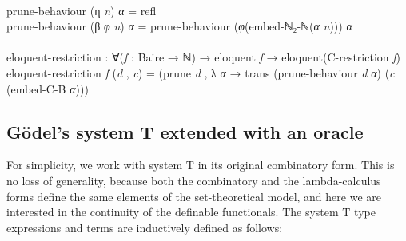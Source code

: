 \documentclass{entcs} \usepackage{prentcsmacro}
\newcommand{\AgdaC}[1]{\mbox{#1}}
\newcommand{\AgdaFontStyle}[1]{\textsf{#1}}
\newcommand{\AgdaBoundFontStyle}[1]{\textit{#1}}
\newcommand{\AgdaSymbol}      [1]{\textcolor{AgdaSymbol}{#1}}
\newcommand{\AgdaBound}    [1]{\AgdaBoundFontStyle{\textcolor{AgdaBound}{#1}}}
\newcommand{\AgdaInductiveConstructor}[1]
    {\AgdaFontStyle{\textcolor{AgdaInductiveConstructor}{#1}}}
\newcommand{\AgdaDatatype} [1]{\AgdaFontStyle{\textcolor{AgdaDatatype}{#1}}}
\newcommand{\AgdaFunction} [1]{\AgdaFontStyle{\textcolor{AgdaFunction}{#1}}}
\newcommand{\AgdaCodeStyle}{\small}
\newenvironment{code}%
{\noindent\AgdaCodeStyle\pboxed}%
{\endpboxed\par\noindent%
\ignorespacesafterend}
\begin{document}
\begin{code}
\>[94]\<%
\\
\>\AgdaFunction{prune-behaviour} \AgdaSymbol{(}\AgdaInductiveConstructor{η} \AgdaBound{n}\AgdaSymbol{)} \<[24]%
\>[24]\AgdaBound{α} \AgdaSymbol{=} \AgdaInductiveConstructor{refl}\<%
\\
\>\AgdaFunction{prune-behaviour} \AgdaSymbol{(}\AgdaInductiveConstructor{β} \AgdaBound{φ} \AgdaBound{n}\AgdaSymbol{)} \AgdaBound{α} \AgdaSymbol{=} \AgdaFunction{prune-behaviour} \AgdaSymbol{(}\AgdaBound{φ}\AgdaSymbol{(}\AgdaFunction{embed-ℕ₂-ℕ}\AgdaSymbol{(}\AgdaBound{α} \AgdaBound{n}\AgdaSymbol{)))} \AgdaBound{α}\<%
\\
%
\\
\>\AgdaFunction{eloquent-restriction} \AgdaSymbol{:} \AgdaSymbol{∀(}\AgdaBound{f} \AgdaSymbol{:} \AgdaFunction{Baire} \AgdaSymbol{→} \AgdaDatatype{ℕ}\AgdaSymbol{)} \AgdaSymbol{→} \AgdaFunction{eloquent} \AgdaBound{f} \AgdaSymbol{→} \AgdaFunction{eloquent}\AgdaSymbol{(}\AgdaFunction{C-restriction} \AgdaBound{f}\AgdaSymbol{)}\<%
\\
\>\AgdaFunction{eloquent-restriction} \AgdaBound{f} \AgdaSymbol{(}\AgdaBound{d} \AgdaInductiveConstructor{,} \AgdaBound{c}\AgdaSymbol{)} \AgdaSymbol{=} \AgdaSymbol{(}\AgdaFunction{prune} \AgdaBound{d} \AgdaInductiveConstructor{,} \AgdaSymbol{λ} \AgdaBound{α} \AgdaSymbol{→} \AgdaFunction{trans} \AgdaSymbol{(}\AgdaFunction{prune-behaviour} \AgdaBound{d} \AgdaBound{α}\AgdaSymbol{)} \AgdaSymbol{(}\AgdaBound{c} \AgdaSymbol{(}\AgdaFunction{embed-C-B} \AgdaBound{α}\AgdaSymbol{)))} \<[97]%
\>[97]\<%
\\
\>\<\end{code}

\subsection{Gödel's system T extended with an oracle} \label{section:oracle}

For simplicity, we work with system \AgdaC{T} in its original
combinatory form. This is no loss of generality, because both the
combinatory and the lambda-calculus forms define the same elements of
the set-theoretical model, and here we are interested in the
continuity of the definable functionals.  The system T type
expressions and terms are inductively defined as follows:
\end{document}

